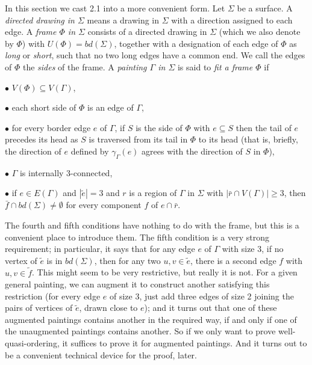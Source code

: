 
In this section we cast 2.1 into a more convenient form. Let $\Sigma$ be a surface. A \textit{directed drawing in $\Sigma$} means a drawing in $\Sigma$ with a direction assigned to each edge. A \textit{frame $\Phi$ in $\Sigma$} consists of a directed drawing in $\Sigma$ (which we also denote by $\Phi$) with $U(\Phi)=bd(\Sigma)$, together with a designation of each edge of $\Phi$ as \textit{long} or \textit{short}, such that no two long edges have a common end. We call the edges of $\Phi$ the \textit{sides} of the frame. A \textit{painting $\Gamma$ in $\Sigma$} is said to \textit{fit a frame $\Phi$} if

\hspace*{12pt}$\bullet$ $V(\Phi)\subseteq V(\Gamma)$,

\hspace*{12pt}$\bullet$ each short side of $\Phi$ is an edge of $\Gamma$,

\hspace*{12pt}$\bullet$ for every border edge $e$ of $\Gamma$, if $S$ is the side of $\Phi$ with $e\subseteq S$ then the tail of $e$ precedes its head as $S$ is traversed from its tail in $\Phi$ to its head (that is, briefly, the direction of $e$ defined by $\gamma_\Gamma(e)$ agrees with the direction of $S$ in $\Phi$),

\hspace*{12pt}$\bullet$ $\Gamma$ is internally 3-connected,

\hspace*{12pt}$\bullet$ if $e\in E(\Gamma)$ and $|\tilde{e}|=3$ and $r$ is a region of $\Gamma$ in $\Sigma$ with $|\bar{r}\cap V(\Gamma)|\ge 3$, then $\bar{f}\cap bd(\Sigma)\ne \emptyset$ for every component $f$ of $e\cap \bar{r}$.

The fourth and fifth conditions have nothing to do with the frame, but this is a convenient place to introduce them. The fifth condition is a very strong requirement; in particular, it says that for any edge $e$ of $\Gamma$ with size 3, if no vertex of $\tilde{e}$ is in $bd(\Sigma)$, then for any two $u,v\in \tilde{e}$, there is a second edge $f$ with $u,v\in \tilde{f}$. This might seem to be very restrictive, but really it is not. For a given general painting, we can augment it to construct another satisfying this restriction (for every edge $e$ of size 3, just add three edges of size 2 joining the pairs of vertices of $\tilde{e}$, drawn close to $e$); and it turns out that one of these augmented paintings contains another in the required way, if and only if one of the unaugmented paintings contains another. So if we only want to prove well-quasi-ordering, it suffices to prove it for augmented paintings. And it turns out to be a convenient technical device for the proof, later.

